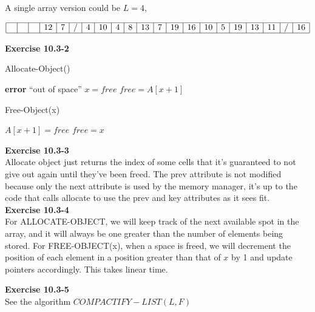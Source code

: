 \documentclass{article}
\begin{document}
A single array version could be $L=4$,

$
\begin{array}{|c|c|c|c|c|c|c|c|c|c|c|c|c|c|c|c|c|c|c|c|c|}
\hline
\,\,&\,\,&\,\,&12&7&/&4&10&4&8&13&7&19&16&10&5&19&13&11&/&16\\
\hline
\end{array}
$

\noindent\textbf{Exercise 10.3-2}\\

\begin{algorithm}
\caption{Allocate-Object()}
\begin{algorithmic}
	\State \textbf{error} ``out of space''
\Else
	\State $x = free$
	\State $free = A[x+1]$
\EndIf
\end{algorithmic}
\end{algorithm}

\begin{algorithm}
\caption{Free-Object(x)}
\begin{algorithmic}
\State $A[x+1] = free$
\State $free = x$
\end{algorithmic}
\end{algorithm}

\noindent\textbf{ Exercise 10.3-3} \\

Allocate object just returns the index of some cells that it's guaranteed to not give out again until they've been freed. The prev attribute is not modified because only the next attribute is used by the memory manager, it's up to the code that calls allocate to use the prev and key attributes as it sees fit.\\

\noindent\textbf{Exercise 10.3-4}\\

For ALLOCATE-OBJECT, we will keep track of the next available spot in the array, and it will always be one greater than the number of elements being stored.  For FREE-OBJECT(x), when a space is freed, we will decrement the position of each element in a position greater than that of $x$ by 1 and update pointers accordingly.  This takes linear time.

\noindent\textbf{ Exercise 10.3-5} \\

See the algorithm ${COMPACTIFY-LIST(L,F)}$
\end{document}
